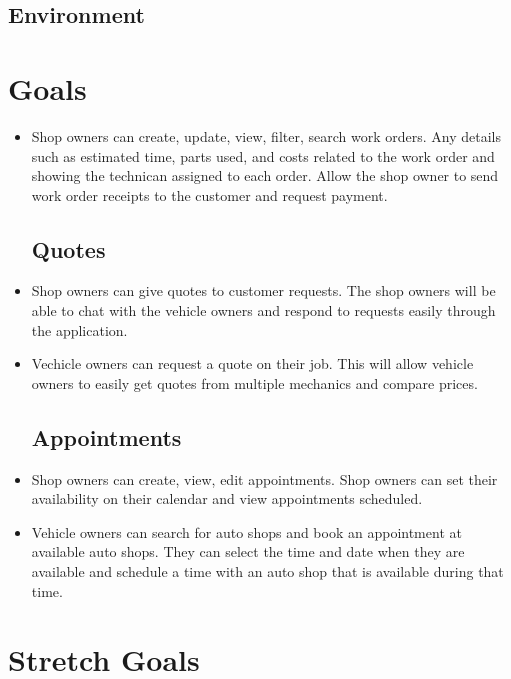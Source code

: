 \documentclass{article}
\begin{document}
\subsection{Environment}


\section{Goals}
\begin{itemize}
\subsection{Work Orders}
\item Shop owners can create, update, view, filter, search work orders. Any details such as estimated time, parts used, and costs related to the work order and showing the technican assigned to each order. Allow the shop owner to send work order receipts to the customer and request payment.
\subsection{Quotes}
\item Shop owners can give quotes to customer requests. The shop owners will be able to chat with the vehicle owners and respond to requests easily through the application.
\item Vechicle owners can request a quote on their job. This will allow vehicle owners to easily get quotes from multiple mechanics and compare prices.
\subsection{Appointments}
\item Shop owners can create, view, edit appointments. Shop owners can set their availability on their calendar and view appointments scheduled.
\item Vehicle owners can search for auto shops and book an appointment at available auto shops. They can select the time and date when they are available and schedule a time with an auto shop that is available during that time.
\end{itemize}

\section{Stretch Goals}
\end{document}
